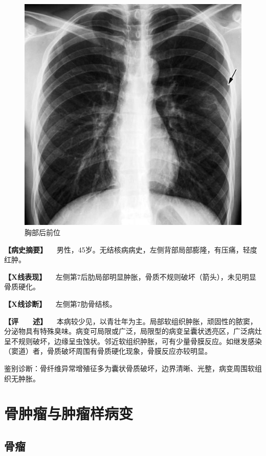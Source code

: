 \begin{figure}[!htbp]
 \centering
 \includegraphics{./images/Image00085.jpg}
 \captionsetup{justification=centering}
 \caption{胸部后前位}
 \label{fig2-6-10}
  \end{figure} 

\textbf{【病史摘要】}
　男性，45岁。无结核病病史，左侧背部局部膨隆，有压痛，轻度红肿。

\textbf{【X线表现】}
　左侧第7后肋局部明显肿胀，骨质不规则破坏（箭头），未见明显骨质硬化。

\textbf{【X线诊断】} 　左侧第7肋骨结核。

\textbf{【评　　述】}
　本病较少见，以青壮年为主。局部软组织肿胀，顽固性的脓窦，分泌物具有特殊臭味。病变可局限或广泛，局限型的病变呈囊状透亮区，广泛病灶呈不规则破坏，边缘呈虫蚀状。邻近软组织肿胀，可有少量骨膜反应。如继发感染（窦道）者，骨质破坏周围有骨质硬化现象，骨膜反应亦较明显。

鉴别诊断：骨纤维异常增殖征多为囊状骨质破坏，边界清晰、光整，病变周围软组织无肿胀。

\section{骨肿瘤与肿瘤样病变}

\subsection{骨瘤}

